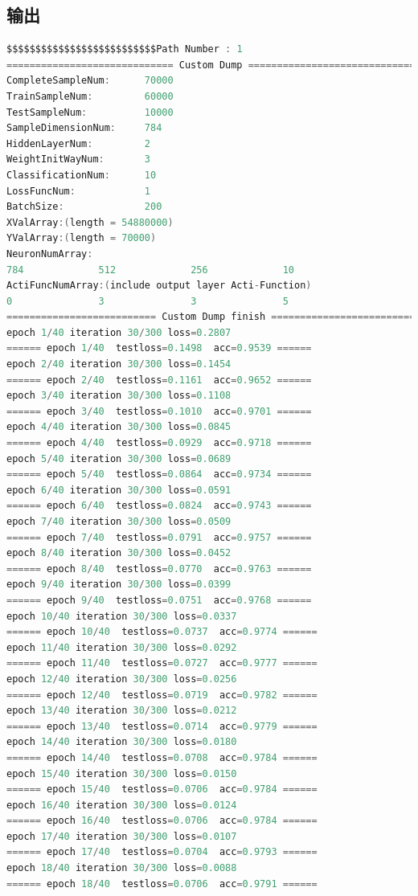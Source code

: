 \documentclass[UTF-8]{progbookcn}
\begin{document}
\subsection{输出}
\begin{lstlisting}[language=C,caption={输出代码}]
$$$$$$$$$$$$$$$$$$$$$$$$$$Path Number : 1
============================= Custom Dump ==============================
CompleteSampleNum:      70000
TrainSampleNum:         60000
TestSampleNum:          10000
SampleDimensionNum:     784
HiddenLayerNum:         2
WeightInitWayNum:       3
ClassificationNum:      10
LossFuncNum:            1
BatchSize:              200
XValArray:(length = 54880000)
YValArray:(length = 70000)
NeuronNumArray:
784             512             256             10
ActiFuncNumArray:(include output layer Acti-Function)
0               3               3               5
========================== Custom Dump finish ==========================
epoch 1/40 iteration 30/300 loss=0.2807
====== epoch 1/40  testloss=0.1498  acc=0.9539 ======
epoch 2/40 iteration 30/300 loss=0.1454
====== epoch 2/40  testloss=0.1161  acc=0.9652 ======
epoch 3/40 iteration 30/300 loss=0.1108
====== epoch 3/40  testloss=0.1010  acc=0.9701 ======
epoch 4/40 iteration 30/300 loss=0.0845
====== epoch 4/40  testloss=0.0929  acc=0.9718 ======
epoch 5/40 iteration 30/300 loss=0.0689
====== epoch 5/40  testloss=0.0864  acc=0.9734 ======
epoch 6/40 iteration 30/300 loss=0.0591
====== epoch 6/40  testloss=0.0824  acc=0.9743 ======
epoch 7/40 iteration 30/300 loss=0.0509
====== epoch 7/40  testloss=0.0791  acc=0.9757 ======
epoch 8/40 iteration 30/300 loss=0.0452
====== epoch 8/40  testloss=0.0770  acc=0.9763 ======
epoch 9/40 iteration 30/300 loss=0.0399
====== epoch 9/40  testloss=0.0751  acc=0.9768 ======
epoch 10/40 iteration 30/300 loss=0.0337
====== epoch 10/40  testloss=0.0737  acc=0.9774 ======
epoch 11/40 iteration 30/300 loss=0.0292
====== epoch 11/40  testloss=0.0727  acc=0.9777 ======
epoch 12/40 iteration 30/300 loss=0.0256
====== epoch 12/40  testloss=0.0719  acc=0.9782 ======
epoch 13/40 iteration 30/300 loss=0.0212
====== epoch 13/40  testloss=0.0714  acc=0.9779 ======
epoch 14/40 iteration 30/300 loss=0.0180
====== epoch 14/40  testloss=0.0708  acc=0.9784 ======
epoch 15/40 iteration 30/300 loss=0.0150
====== epoch 15/40  testloss=0.0706  acc=0.9784 ======
epoch 16/40 iteration 30/300 loss=0.0124
====== epoch 16/40  testloss=0.0706  acc=0.9784 ======
epoch 17/40 iteration 30/300 loss=0.0107
====== epoch 17/40  testloss=0.0704  acc=0.9793 ======
epoch 18/40 iteration 30/300 loss=0.0088
====== epoch 18/40  testloss=0.0706  acc=0.9791 ======

\end{lstlisting}
\end{document}
